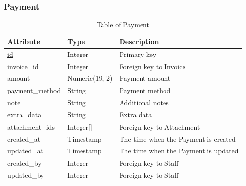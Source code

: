 \subsubsection{Payment}
\begin{table}[H]
    \centering
    \begin{tabular}{|p{3cm}|p{3cm}|p{\dimexpr\textwidth-7.8cm}|} %
        \hline
        \rowcolor[HTML]{C0C0C0} 
        \textbf{Attribute} & \textbf{Type} & \textbf{Description} \\ \hline
        \underline{id} & Integer & Primary key \\ \hline
        invoice\_id & Integer & Foreign key to Invoice \\ \hline
        amount & Numeric(19, 2) & Payment amount \\ \hline
        payment\_method & String & Payment method \\ \hline
        note & String & Additional notes \\ \hline
        extra\_data & String & Extra data \\ \hline
        attachment\_ids & Integer[] & Foreign key to Attachment \\ \hline
        created\_at & Timestamp & The time when the Payment is created \\ \hline
        updated\_at & Timestamp & The time when the Payment is updated \\ \hline
        created\_by & Integer & Foreign key to Staff \\ \hline
        updated\_by & Integer & Foreign key to Staff \\ \hline
    \end{tabular}
    \caption{Table of Payment}
    \label{tab:payment-table}
\end{table}

